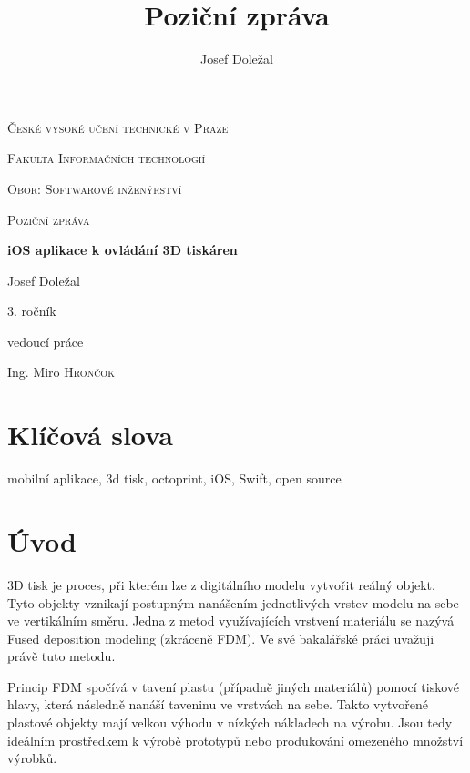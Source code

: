 \documentclass[czech]{article}
\begin{document}
\title{Poziční zpráva}
\author{Josef Doležal}

\begin{titlepage}
	\centering
	{\scshape\LARGE České vysoké učení technické v Praze \par}
	{\scshape\Large Fakulta Informačních technologií \par}
	{\scshape\Large Obor: Softwarové inženýrství \par}
	\vspace{1cm}
	{\scshape\Large Poziční zpráva\par}
	\vspace{1.5cm}
	{\huge\bfseries iOS aplikace k ovládání 3D tiskáren\par}
	\vspace{2cm}
	{\Large Josef Doležal\par}
	{\normalsize 3. ročník\par}
	\vfill
	vedoucí práce\par
	Ing. Miro \textsc{Hrončok}

	\vfill
\end{titlepage}

\newpage

\tableofcontents{}

\newpage

\section{Klíčová slova}

mobilní aplikace, 3d tisk, octoprint, iOS, Swift, open source


\section{Úvod}

3D tisk je proces, při kterém lze z digitálního modelu vytvořit reálný objekt. Tyto objekty vznikají postupným nanášením jednotlivých vrstev modelu na sebe ve vertikálním směru. Jedna z metod využívajících vrstvení materiálu se nazývá Fused deposition modeling (zkráceně FDM). Ve své bakalářské práci uvažuji právě tuto metodu.

Princip FDM spočívá v tavení plastu (případně jiných materiálů) pomocí tiskové hlavy, která následně nanáší taveninu ve vrstvách na sebe\cite{fdm}. Takto vytvořené plastové objekty mají velkou výhodu v nízkých nákladech na výrobu. Jsou tedy ideálním prostředkem k výrobě prototypů nebo produkování omezeného množství výrobků.
\end{document}
